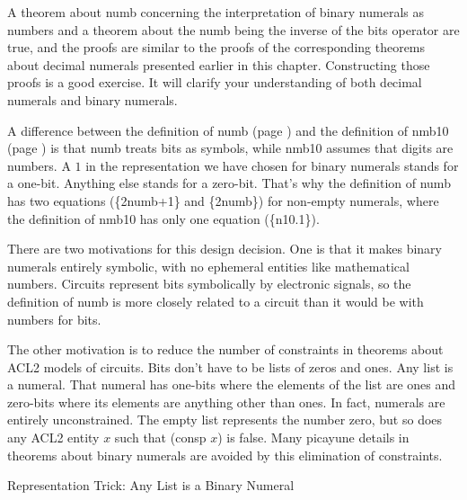 A theorem about \textsf{numb} concerning the interpretation of
binary numerals as numbers and a theorem about the \textsf{numb}
being the inverse of the \textsf{bits} operator are true,
and the proofs are similar to the proofs of the corresponding
theorems about decimal numerals presented earlier in this chapter.
Constructing those proofs is a good exercise.
It will clarify your understanding of both decimal numerals
and binary numerals.

\begin{aside}
A difference between the definition of \textsf{numb} (page \pageref{nmb-defun})
and the definition of \textsf{nmb10} (page \pageref{nmb10-defun})
is that \textsf{numb} treats bits as symbols,
while \textsf{nmb10} assumes that digits are numbers.
A $1$ in the representation we have chosen for binary numerals
stands for a one-bit. Anything else stands for a zero-bit.
That's why the definition of \textsf{numb} has two equations (\{2numb+1\} and \{2numb\})
for non-empty numerals,
where the definition of \textsf{nmb10} has only one equation (\{n10.1\}).

There are two motivations for this design decision.
One is that it makes binary numerals entirely symbolic,
with no ephemeral entities like mathematical numbers.
Circuits represent bits symbolically by electronic signals,
so the definition of \textsf{numb} is more closely
related to a circuit than it would be with numbers for bits.

The other motivation is to reduce the number of constraints
in theorems about ACL2 models of circuits.
Bits don't have to be lists of zeros and ones.
Any list is a numeral.
That numeral has one-bits where the elements of the list are ones
and zero-bits where its elements are anything other than ones.
In fact, numerals are entirely unconstrained.
The empty list represents the number zero,
but so does any ACL2 entity $x$ such that \textsf{(consp $x$)} is false.
Many picayune details in theorems about binary numerals
are avoided by this elimination of constraints.
\caption{Representation Trick: Any List is a Binary Numeral}
\label{aside:numeral-representation-trick}
\end{aside}


